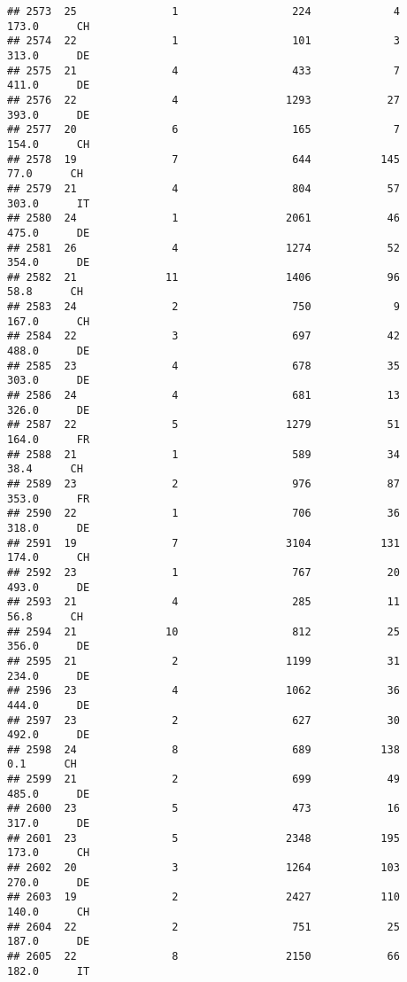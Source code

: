 \documentclass[
]{article}
\begin{document}
\begin{verbatim}
## 2573  25               1                  224             4    173.0      CH
## 2574  22               1                  101             3    313.0      DE
## 2575  21               4                  433             7    411.0      DE
## 2576  22               4                 1293            27    393.0      DE
## 2577  20               6                  165             7    154.0      CH
## 2578  19               7                  644           145     77.0      CH
## 2579  21               4                  804            57    303.0      IT
## 2580  24               1                 2061            46    475.0      DE
## 2581  26               4                 1274            52    354.0      DE
## 2582  21              11                 1406            96     58.8      CH
## 2583  24               2                  750             9    167.0      CH
## 2584  22               3                  697            42    488.0      DE
## 2585  23               4                  678            35    303.0      DE
## 2586  24               4                  681            13    326.0      DE
## 2587  22               5                 1279            51    164.0      FR
## 2588  21               1                  589            34     38.4      CH
## 2589  23               2                  976            87    353.0      FR
## 2590  22               1                  706            36    318.0      DE
## 2591  19               7                 3104           131    174.0      CH
## 2592  23               1                  767            20    493.0      DE
## 2593  21               4                  285            11     56.8      CH
## 2594  21              10                  812            25    356.0      DE
## 2595  21               2                 1199            31    234.0      DE
## 2596  23               4                 1062            36    444.0      DE
## 2597  23               2                  627            30    492.0      DE
## 2598  24               8                  689           138      0.1      CH
## 2599  21               2                  699            49    485.0      DE
## 2600  23               5                  473            16    317.0      DE
## 2601  23               5                 2348           195    173.0      CH
## 2602  20               3                 1264           103    270.0      DE
## 2603  19               2                 2427           110    140.0      CH
## 2604  22               2                  751            25    187.0      DE
## 2605  22               8                 2150            66    182.0      IT

\end{verbatim}
\end{document}
